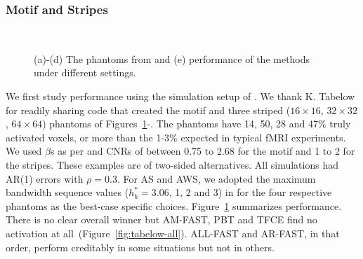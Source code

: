\subsubsection{Motif and Stripes}
\label{tabelow}
\begin{figure}[h]
  \mbox{
}
\mbox{
}
\caption{(a)-(d) The phantoms from \citep{polzehletal10} and (e)
  performance of the  methods  under  different
  settings.}
\label{fig:tabelow}
\end{figure}
We first study performance using the simulation setup of 
\citet{polzehletal10}. We thank K. Tabelow for readily sharing code
that created  the motif and three striped ($16\times 16$, $32\times 32$,
$64\times 64$) phantoms of
Figures~\ref{fig:tabelow}-.
The phantoms have 14, 50, 28 and 47\% truly activated voxels, or
more than the 1-3\% expected in typical fMRI experiments. 
We used $\beta$s as per \citet{polzehletal10} and  CNRs
of between  0.75 to 2.68 for the motif and  1 to 2 for
the stripes. These examples are of two-sided alternatives. All simulations  had AR(1) errors with
$\rho=0.3$. For AS and AWS, we adopted the maximum bandwidth sequence values 
($h_k^*=3.06$, 1, 2 and 3)  in \citet{polzehletal10} for the four
respective phantoms as 
the best-case specific choices.
 Figure~\ref{fig:tabelow} summarizes
 performance. There is no clear overall winner but AM-FAST,
 PBT and TFCE find no activation at
 all~(Figure~\ref{fig:tabelow-all}). ALL-FAST and AR-FAST, in that order,
 perform creditably  in some situations but not in others.
